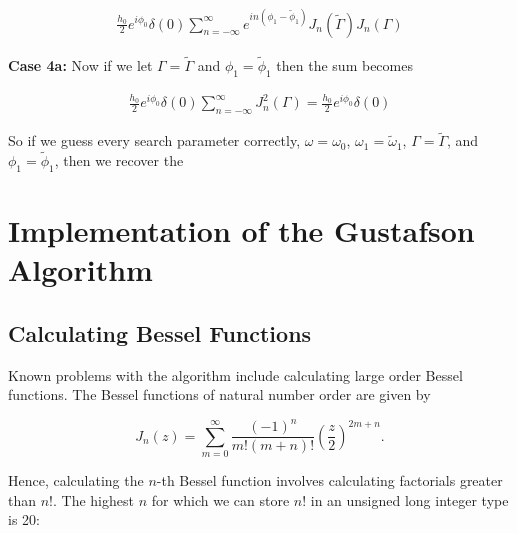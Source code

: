 \documentclass[onecolumn, groupedaddress, 10pt]{revtex4-1}
\begin{document}
\begin{align}
\frac{h_0}{2} e^{i\phi_0} \delta(0) \sum_{n=-\infty}^{\infty} e^{in(\phi_1-\widetilde{\phi}_1)} J_n(\widetilde{\Gamma}) J_n (\Gamma)
\end{align}

\textbf{Case 4a:} Now if we let $\Gamma = \widetilde{\Gamma}$ and $\phi_1 = \widetilde{\phi}_1$ then the sum becomes

\begin{align}
\frac{h_0}{2} e^{i\phi_0} \delta(0) \sum_{n=-\infty}^{\infty} J_n^2 (\Gamma) = \frac{h_0}{2} e^{i\phi_0} \delta(0)
\end{align}

So if we guess every search parameter correctly, $\omega = \omega_0$, $\omega_1 = \widetilde{\omega}_1$, $\Gamma = \widetilde{\Gamma}$, and $\phi_1 = \widetilde{\phi}_1$, then we recover the 









\section{Implementation of the Gustafson Algorithm}
\subsection{Calculating Bessel Functions}
Known problems with the algorithm include calculating large order Bessel functions.  The Bessel functions of natural number order are given by

\begin{equation}
J_n(z) = \sum_{m=0}^{\infty} \frac{(-1)^n}{m!(m+n)!} \left( \frac{z}{2} \right)^{2m+n}.
\end{equation}

Hence, calculating the $n$-th Bessel function involves calculating factorials greater than $n!$.  The highest $n$ for which we can store $n!$ in an unsigned long integer type is 20:
\end{document}
